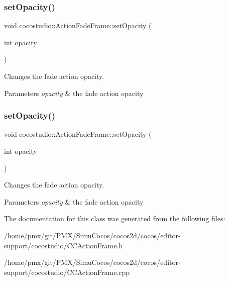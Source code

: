 \subsubsection{\texorpdfstring{set\+Opacity()}{setOpacity()}\hspace{0.1cm}{\footnotesize\ttfamily [1/2]}}
{\footnotesize\ttfamily void cocostudio\+::\+Action\+Fade\+Frame\+::set\+Opacity (\begin{DoxyParamCaption}\item[{int}]{opacity }\end{DoxyParamCaption})}

Changes the fade action opacity.


\begin{DoxyParams}{Parameters}
{\em opacity} & the fade action opacity \\
\hline
\end{DoxyParams}
\mbox{\label{classcocostudio_1_1ActionFadeFrame_a1406c854b4e65c99e81566e1c4d95ea5}} 
\subsubsection{\texorpdfstring{set\+Opacity()}{setOpacity()}\hspace{0.1cm}{\footnotesize\ttfamily [2/2]}}
{\footnotesize\ttfamily void cocostudio\+::\+Action\+Fade\+Frame\+::set\+Opacity (\begin{DoxyParamCaption}\item[{int}]{opacity }\end{DoxyParamCaption})}

Changes the fade action opacity.


\begin{DoxyParams}{Parameters}
{\em opacity} & the fade action opacity \\
\hline
\end{DoxyParams}


The documentation for this class was generated from the following files\+:\begin{DoxyCompactItemize}
\item 
/home/pmx/git/\+P\+M\+X/\+Simu\+Cocos/cocos2d/cocos/editor-\/support/cocostudio/C\+C\+Action\+Frame.\+h\item 
/home/pmx/git/\+P\+M\+X/\+Simu\+Cocos/cocos2d/cocos/editor-\/support/cocostudio/C\+C\+Action\+Frame.\+cpp\end{DoxyCompactItemize}
